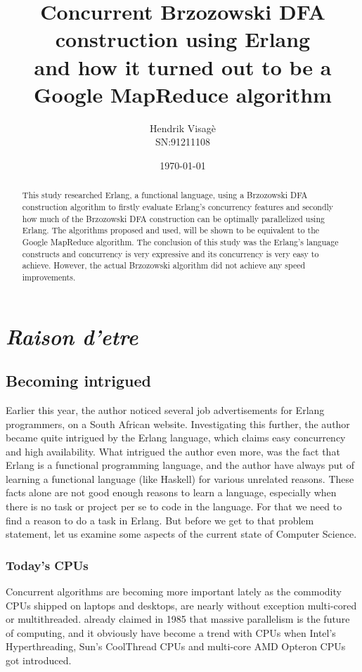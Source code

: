 \documentclass[a4paper,11pt]{report}
\author{Hendrik Visag\`e\\SN:91211108}
\title{Concurrent Brzozowski
	DFA construction using Erlang
 \\\small{and how it turned out to be a
		Google MapReduce algorithm}}
\date{\today}
\begin{document}
\maketitle

\begin{abstract}

This study researched Erlang, a functional language, using a
Brzozowski DFA construction algorithm to firstly evaluate Erlang's
concurrency features and secondly how much of the Brzozowski DFA
construction can be optimally parallelized using Erlang.  The
algorithms proposed and used, will be shown to be equivalent to the
Google MapReduce algorithm. The conclusion of this study was the
Erlang's language constructs and concurrency is very expressive and
its concurrency is very easy to achieve. However, the actual
Brzozowski algorithm did not achieve any speed improvements.

\end{abstract}

%
\clearpage{}
\tableofcontents
\lstlistoflistings
\clearpage{}


\chapter{\textit{Raison d'etre}}

\section{Becoming intrigued}

Earlier this year, the author noticed several job advertisements for
Erlang programmers, on a South African website. Investigating this
further, the author became quite intrigued by the Erlang language,
which claims easy concurrency and high availability.  What intrigued
the author even more, was the fact that Erlang is a functional
programming language, and the author have always put of learning a
functional language (like Haskell) for various unrelated reasons. These
facts alone are not good enough reasons to learn a language,
especially when there is no task or project per se to code in the
language. For that we need to find a reason to do a task in
Erlang. But before we get to that problem statement, let us examine
some aspects of the current state of Computer Science.

\subsection{Today's CPUs}
Concurrent algorithms are becoming more important lately as the
commodity CPUs shipped on laptops and desktops, are nearly without
exception multi-cored or multithreaded. \cite{ActorModel} already
claimed in 1985 that massive parallelism is the future of computing,
and it obviously have become a trend with CPUs when Intel's
Hyperthreading, Sun's CoolThread CPUs and multi-core AMD Opteron CPUs
got introduced.
\end{document}
